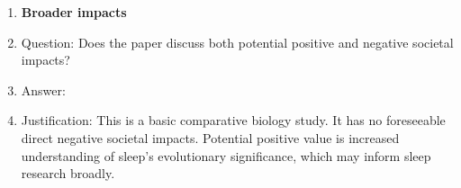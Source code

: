 \documentclass{article}
\begin{document}
\begin{enumerate}
\item {\bf Broader impacts}
    \item[] Question: Does the paper discuss both potential positive and negative societal impacts?
    \item[] Answer: \answerNA{}
    \item[] Justification: This is a basic comparative biology study. It has no foreseeable direct negative societal impacts. Potential positive value is increased understanding of sleep's evolutionary significance, which may inform sleep research broadly.

\end{enumerate}
\end{document}
